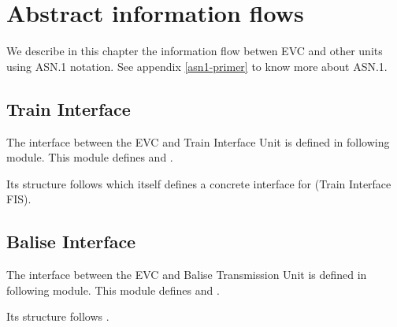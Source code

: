 \chapter{Abstract information flows}
\label{information-flows}

We describe in this chapter the information flow betwen EVC and other
units using ASN.1 notation. See appendix \ref{asn1-primer} to know
more about ASN.1.

\section{Train Interface}

The interface between the EVC and Train Interface Unit is defined in
following  module. This module defines
 and
.

Its structure follows \cite{subset-094} which itself defines a
concrete interface for \cite{subset-034} (Train Interface FIS).



\section{Balise Interface}

The interface between the EVC and Balise Transmission Unit is defined
in following  module. This module defines
 and
.

Its structure follows \cite[§4.8 Eurobalise interface]{alstom-api}.




